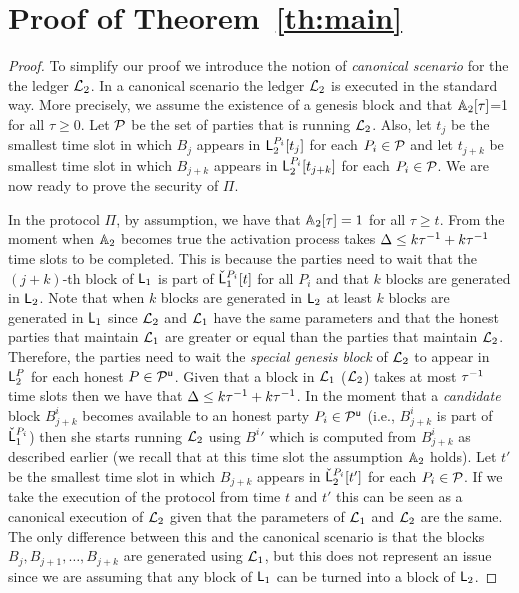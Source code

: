 \section{Proof of Theorem~\ref{th:main}}\label{se:proof}
\begin{proof}
To simplify our proof we introduce the notion of \emph{canonical scenario} for the the ledger $\mathcal{L}_2$. In a canonical scenario the ledger
$\mathcal{L}_2$ is executed in the standard way. More precisely, 
we assume the existence of a genesis block and that $\mathbb{A}_2[\tau]$=1 for all $\tau \geq 0$. Let $\mathcal{P}$ be the set of parties that is running $\mathcal{L}_2$. Also, 
let $t_j$ be the smallest time slot in which $B_j$ appears in  $\mathsf{L}_2^{P_i}[t_j]$ for each $P_i\in\mathcal{P}$ and let $t_{j+k}$ be smallest time slot in which $B_{j+k}$ appears in %
$\mathsf{L}_2^{P_i}[t_{j+k}]$ for each $P_i\in\mathcal{P}$.
We are now ready to prove the security of $\Pi$.

In the protocol $\Pi$, by assumption, we have that $\mathbb{A}_2[\tau]=1$ for all $\tau \geq t$. 
From the moment when $\mathbb{A}_2$ becomes true the activation process takes $\Delta\leq k \tau^{-1} + k \tau^{-1}$  time slots to be completed.
This is because the parties need to wait that the $(j+k)$-th block of $\mathsf{L}_1$ is part of $\check {\mathsf{L}}_1^{P_i}[t]$  for all $P_i$ and that $k$ blocks are generated in $\mathsf{L}_2$. Note that when $k$ blocks are generated in $\mathsf{L}_2$ at least 
$k$ blocks are generated in $\mathsf{L}_1$ since $\mathcal{L}_2$ and $\mathcal{L}_1$ have the same parameters and that the honest parties that maintain $\mathcal{L}_1$ are greater or equal than the parties that maintain $\mathcal{L}_2$. Therefore, the parties need to wait the \emph{special genesis block} of $\mathcal{L}_2$ to appear 
in $\mathsf{L}_2^P$ for each honest $P\in\mathcal{P}^\mathsf{u}$. Given that a block in $\mathcal{L}_1$ ($\mathcal{L}_2$) takes at most $\tau^{-1}$ time slots then we have that $\Delta \leq k \tau^{-1} + k \tau^{-1}$.
In the moment that a \emph{candidate} block $B^i_{j+k}$ becomes available to an honest party $P_i\in\mathcal{P}^\mathsf{u}$ (i.e., $B^i_{j+k}$ is part of $\check {\mathsf{L}}_1^{P_i}$) then she starts running $\mathcal{L}_2$
using ${B^i}'$ which is computed from $B^i_{j+k}$ as described earlier (we recall that at this time slot the assumption $\mathbb{A}_2$ holds).
Let $t'$ be the smallest time slot in which $B_{j+k}$ appears in $\check {\mathsf{L}}_2^{P_i}[t']$
 for each $P_i\in\mathcal{P}$.
If we take the execution of the protocol from time $t$ and $t'$ this can be seen as a canonical execution of $\mathcal{L}_2$ given
that the parameters of $\mathcal{L}_1$ and $\mathcal{L}_2$ are the same. The only difference between this and the canonical scenario is
that the blocks $B_{j}, B_{j+1},\dots, B_{j+k}$  are generated using $\mathcal{L}_1$, but this does not represent an issue since we are assuming that
any block of $\mathsf{L}_1$ can be turned into a block of $\mathsf{L}_2$. \end{proof}









